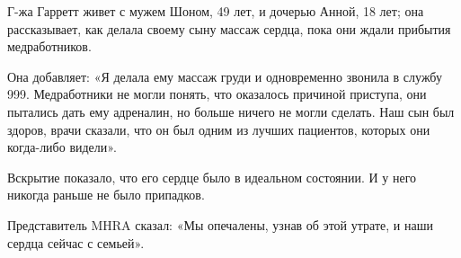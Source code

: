 Г-жа Гарретт живет с мужем Шоном, 49 лет, и дочерью Анной, 18 лет; она
рассказывает, как делала своему сыну массаж сердца, пока они ждали прибытия
медработников.

Она добавляет: «Я делала ему массаж груди и одновременно звонила в службу
999. Медработники не могли понять, что оказалось причиной приступа, они пытались
дать ему адреналин, но больше ничего не могли сделать. Наш сын был здоров, врачи
сказали, что он был одним из лучших пациентов, которых они когда-либо видели».

Вскрытие показало, что его сердце было в идеальном состоянии. И у него никогда
раньше не было припадков.

Представитель MHRA сказал: «Мы опечалены, узнав об этой утрате, и наши сердца
сейчас с семьей».
